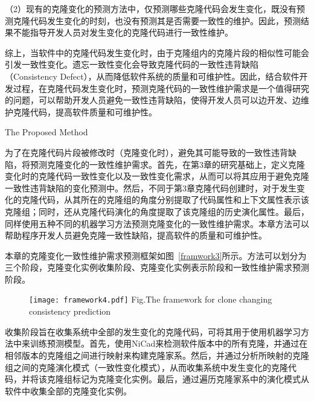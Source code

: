 （2）现有的克隆变化的预测方法中，仅预测哪些克隆代码会发生变化，既没有预测克隆代码发生变化的时刻，也没有预测其是否需要一致性的维护。因此，预测结果不能指导开发人员对发生变化的克隆代码进行一致性维护。

综上，当软件中的克隆代码发生变化时，由于克隆组内的克隆片段的相似性可能会引发一致性变化。遗忘一致性变化会导致克隆代码的一致性违背缺陷（Consistency Defect），从而降低软件系统的质量和可维护性。因此，结合软件开发过程，在克隆代码发生变化时，预测克隆代码的一致性维护需求是一个值得研究的问题，可以帮助开发人员避免一致性违背缺陷，使得开发人员可以边开发、边维护克隆代码，提高软件质量和可维护性。

{The Proposed Method}

为了在克隆代码片段被修改时（克隆变化时），避免其可能导致的一致性违背缺陷，将预测克隆变化的一致性维护需求。首先，在第3章的研究基础上，定义克隆变化时的克隆代码一致性变化以及一致性变化需求，从而可以将其应用于避免克隆一致性违背缺陷的变化预测中。然后，不同于第3章克隆代码创建时，对于发生变化的克隆代码，从其所在的克隆组的角度分别提取了代码属性和上下文属性表示该克隆组；同时，还从克隆代码演化的角度提取了该克隆组的历史演化属性。最后，同样使用五种不同的机器学习方法预测克隆变化的一致性维护需求。本章方法可以帮助程序开发人员避免克隆一致性缺陷，提高软件的质量和可维护性。

本章的克隆变化一致性维护需求预测框架如图~\ref{framwork3}所示。方法可以划分为三个阶段，克隆变化实例收集阶段、克隆变化实例表示阶段和一致性维护需求预测阶段。

\begin{figure}[htbp]
\centering
\texttt{[image: framework4.pdf]}
{Fig.$\!$}{The framework for clone changing consistency prediction}
\vspace{-1em}
\end{figure}

收集阶段旨在收集系统中全部的发生变化的克隆代码，可将其用于使用机器学习方法中来训练预测模型。首先，使用NiCad来检测软件版本中的所有克隆，并通过在相邻版本的克隆组之间进行映射来构建克隆家系。然后，并通过分析所映射的克隆组之间的克隆演化模式（一致性变化模式），从而收集系统中发生变化的克隆代码，并将该克隆组标记为克隆变化实例。最后，通过遍历克隆家系中的演化模式从软件中收集全部的克隆变化实例。

